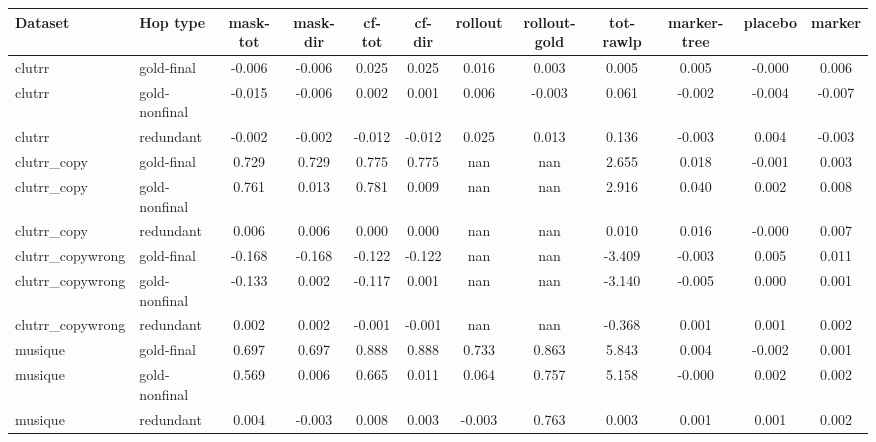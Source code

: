 \begin{tabular}{llcccccccccc}
\toprule
Dataset & Hop type & mask-tot & mask-dir & cf-tot & cf-dir & rollout & rollout-gold & tot-rawlp & marker-tree & placebo & marker \\
\midrule
clutrr & gold-final & -0.006 & -0.006 & 0.025 & 0.025 & 0.016 & 0.003 & 0.005 & 0.005 & -0.000 & 0.006 \\
clutrr & gold-nonfinal & -0.015 & -0.006 & 0.002 & 0.001 & 0.006 & -0.003 & 0.061 & -0.002 & -0.004 & -0.007 \\
clutrr & redundant & -0.002 & -0.002 & -0.012 & -0.012 & 0.025 & 0.013 & 0.136 & -0.003 & 0.004 & -0.003 \\
clutrr\_copy & gold-final & 0.729 & 0.729 & 0.775 & 0.775 & nan & nan & 2.655 & 0.018 & -0.001 & 0.003 \\
clutrr\_copy & gold-nonfinal & 0.761 & 0.013 & 0.781 & 0.009 & nan & nan & 2.916 & 0.040 & 0.002 & 0.008 \\
clutrr\_copy & redundant & 0.006 & 0.006 & 0.000 & 0.000 & nan & nan & 0.010 & 0.016 & -0.000 & 0.007 \\
clutrr\_copywrong & gold-final & -0.168 & -0.168 & -0.122 & -0.122 & nan & nan & -3.409 & -0.003 & 0.005 & 0.011 \\
clutrr\_copywrong & gold-nonfinal & -0.133 & 0.002 & -0.117 & 0.001 & nan & nan & -3.140 & -0.005 & 0.000 & 0.001 \\
clutrr\_copywrong & redundant & 0.002 & 0.002 & -0.001 & -0.001 & nan & nan & -0.368 & 0.001 & 0.001 & 0.002 \\
musique & gold-final & 0.697 & 0.697 & 0.888 & 0.888 & 0.733 & 0.863 & 5.843 & 0.004 & -0.002 & 0.001 \\
musique & gold-nonfinal & 0.569 & 0.006 & 0.665 & 0.011 & 0.064 & 0.757 & 5.158 & -0.000 & 0.002 & 0.002 \\
musique & redundant & 0.004 & -0.003 & 0.008 & 0.003 & -0.003 & 0.763 & 0.003 & 0.001 & 0.001 & 0.002 \\
\bottomrule
\end{tabular}
